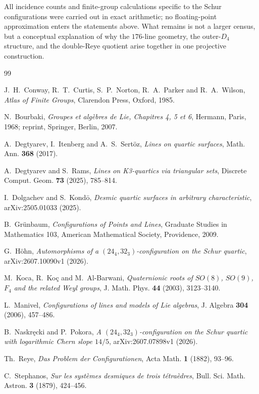 \documentclass[10pt]{article}
\begin{document}
All incidence counts and finite-group calculations specific to the Schur
configurations were carried out in exact arithmetic; no floating-point
approximation enters the statements above.  What remains is not a larger
census, but a conceptual explanation of why the $176$-line geometry, the
outer-$D_4$ structure, and the double-Reye quotient arise together in one
projective construction.

\begin{thebibliography}{99}\small

J.~H.~Conway, R.~T.~Curtis, S.~P.~Norton, R.~A.~Parker and R.~A.~Wilson,
\emph{Atlas of Finite Groups}, Clarendon Press, Oxford, 1985.

N.~Bourbaki,
\emph{Groupes et alg\`ebres de Lie, Chapitres 4, 5 et 6},
Hermann, Paris, 1968; reprint, Springer, Berlin, 2007.

A.~Degtyarev, I.~Itenberg and A.~S.~Sert\"oz,
\emph{Lines on quartic surfaces}, Math. Ann. \textbf{368} (2017).

A.~Degtyarev and S.~Rams,
\emph{Lines on K3-quartics via triangular sets},
Discrete Comput. Geom. \textbf{73} (2025), 785--814.

I.~Dolgachev and S.~Kond\=o,
\emph{Desmic quartic surfaces in arbitrary characteristic},
arXiv:2505.01033 (2025).

B.~Gr\"unbaum,
\emph{Configurations of Points and Lines},
Graduate Studies in Mathematics 103, American Mathematical Society,
Providence, 2009.

G.~H\"ohn,
\emph{Automorphisms of a $(24_4,32_3)$-configuration on the Schur quartic},
arXiv:2607.10090v1 (2026).

M.~Koca, R.~Ko\c{c} and M.~Al-Barwani,
\emph{Quaternionic roots of $SO(8)$, $SO(9)$, $F_4$ and the related
Weyl groups},
J. Math. Phys. \textbf{44} (2003), 3123--3140.

L.~Manivel,
\emph{Configurations of lines and models of Lie algebras},
J. Algebra \textbf{304} (2006), 457--486.

B.~Naskr\k{e}cki and P.~Pokora,
\emph{A $(24_4,32_3)$-configuration on the Schur quartic with logarithmic
Chern slope $14/5$}, arXiv:2607.07898v1 (2026).

Th.~Reye,
\emph{Das Problem der Configurationen},
Acta Math. \textbf{1} (1882), 93--96.

C.~Stephanos,
\emph{Sur les syst\`emes desmiques de trois t\'etra\`edres},
Bull. Sci. Math. Astron. \textbf{3} (1879), 424--456.

\end{thebibliography}
\end{document}
